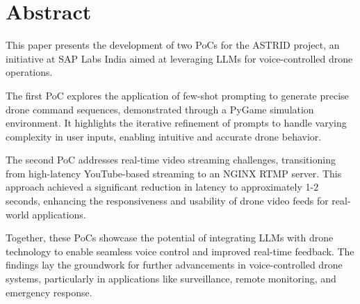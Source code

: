 \section*{Abstract}
This paper presents the development of two \acp{PoC} for the \ac{ASTRID} project, 
an initiative at SAP Labs India aimed at leveraging \acp{LLM} for voice-controlled drone operations. 

The first \ac{PoC} explores the application of few-shot prompting to generate precise drone command sequences, demonstrated through a PyGame simulation environment. 
It highlights the iterative refinement of prompts to handle varying complexity in user inputs, enabling intuitive and accurate drone behavior.

The second \ac{PoC} addresses real-time video streaming challenges, transitioning from high-latency YouTube-based streaming to an NGINX \ac{RTMP} server. 
This approach achieved a significant reduction in latency to approximately 1-2 seconds, enhancing the responsiveness and usability of drone video feeds for real-world applications.

Together, these \acp{PoC} showcase the potential of integrating \acp{LLM} with drone technology to enable seamless voice control and improved real-time feedback. 
The findings lay the groundwork for further advancements in voice-controlled drone systems, particularly in applications like surveillance, remote monitoring, and emergency response.